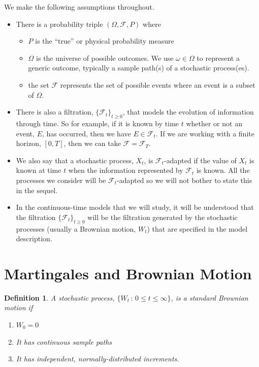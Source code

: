 \newtheorem{definition}{Definition}
\newtheorem{theorem}{Theorem}
\newtheorem{example}{Example}
\newtheorem{remark}{Remark}

We make the following assumptions throughout.
\begin{itemize}
    \item There is a probability triple $(\Omega, \mathcal{F}, P)$ where
    \begin{itemize}
        \item $P$ is the “true” or physical probability measure
        \item $\Omega$ is the universe of possible outcomes. We use $\omega \in \Omega$ to represent a generic outcome, typically a sample path(s) of a stochastic process(es).
        \item the set $\mathcal{F}$ represents the set of possible events where an event is a subset of $\Omega$.
    \end{itemize}
    \item There is also a filtration, $\{\mathcal{F}_t\}_{t \geq 0}$, that models the evolution of information through time. So for example, if it is known by time $t$ whether or not an event, $E$, has occurred, then we have $E \in \mathcal{F}_t$. If we are working with a finite horizon, $[0, T]$, then we can take $\mathcal{F} = \mathcal{F}_T$.
    \item We also say that a stochastic process, $X_t$, is $\mathcal{F}_t$-adapted if the value of $X_t$ is known at time $t$ when the information represented by $\mathcal{F}_t$ is known. All the processes we consider will be $\mathcal{F}_t$-adapted so we will not bother to state this in the sequel.
    \item In the continuous-time models that we will study, it will be understood that the filtration $\{\mathcal{F}_t\}_{t \geq 0}$ will be the filtration generated by the stochastic processes (usually a Brownian motion, $W_t$) that are specified in the model description.
\end{itemize}

\section{Martingales and Brownian Motion}
\begin{definition}
A stochastic process, $\{W_t \, : \, 0 \leq t \leq \infty\}$, is a standard Brownian motion if
\begin{enumerate}
    \item $W_0 = 0$
    \item It has continuous sample paths
    \item It has independent, normally-distributed increments.
\end{enumerate}
\end{definition}

